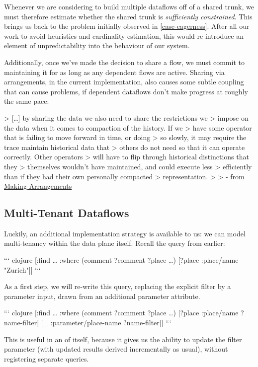 \documentclass[../catalog.tex]{subfiles}
\begin{document}
Whenever we are considering to build multiple dataflows off of a
shared trunk, we must therefore estimate whether the shared trunk is
\emph{sufficiently constrained}. This brings us back to the problem
initially observed in \ref{case-eagerness}. After all our work to
avoid heuristics and cardinality estimation, this would re-introduce
an element of unpredictability into the behaviour of our system.

Additionally, once we've made the decision to share a flow, we must
commit to maintaining it for as long as any dependent flows are
active. Sharing via arrangements, in the current implementation, also
causes some subtle coupling that can cause problems, if dependent
dataflows don't make progress at roughly the same pace:

> [\ldots{}] by sharing the data we also need to share the restrictions we
> impose on the data when it comes to compaction of the history. If we
> have some operator that is failing to move forward in time, or doing
> so slowly, it may require the trace maintain historical data that
> others do not need so that it can operate correctly. Other operators
> will have to flip through historical distinctions that they
> themselves wouldn't have maintained, and could execute less
> efficiently than if they had their own personally compacted
> representation.
> 
> - from \href{https://github.com/frankmcsherry/blog/blob/master/posts/2017-05-01.md}{Making Arrangements}

\subsection{Multi-Tenant Dataflows}

Luckily, an additional implementation strategy is available to us: we
can model multi-tenancy within the data plane itself. Recall the query
from earlier:

``` clojure
[:find \ldots{}
 :where
 (comment ?comment ?place \ldots{})
 [?place :place/name "Zurich"]]
```

As a first step, we will re-write this query, replacing the explicit
filter by a parameter input, drawn from an additional parameter
attribute.

``` clojure
[:find \ldots{}
 :where
 (comment ?comment ?place \ldots{})
 [?place :place/name ?name-filter]
 [\_ :parameter/place-name ?name-filter]]
```

This is useful in an of itself, because it gives us the ability to
update the filter parameter (with updated results derived
incrementally as usual), without registering separate queries.
\end{document}
